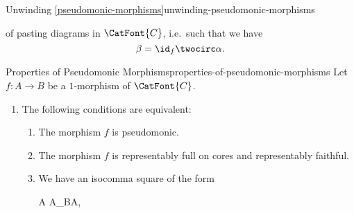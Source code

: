 \begin{remark}{Unwinding \cref{pseudomonic-morphisms}}{unwinding-pseudomonic-morphisms}
\begin{enumerate}
\begin{webcompile}
            \end{webcompile}
            of pasting diagrams in $\CatFont{C}$, i.e.\ such that we have
            \[
                \beta%
                =%
                \id_{f}\twocirc\alpha.%
            \]%
    \end{enumerate}
\end{remark}
\begin{proposition}{Properties of Pseudomonic Morphisms}{properties-of-pseudomonic-morphisms}%
    Let $f\colon A\to B$ be a $1$-morphism of $\CatFont{C}$.
    \begin{enumerate}
        \item\label{properties-of-pseudomonic-morphisms-characterisations}The following conditions are equivalent:
            \begin{enumerate}
                \item\label{properties-of-pseudomonic-morphisms-characterisations-a}The morphism $f$ is pseudomonic.
                \item\label{properties-of-pseudomonic-morphisms-characterisations-b}The morphism $f$ is representably full on cores and representably faithful.
                \item\label{properties-of-pseudomonic-morphisms-characterisations-c}We have an isocomma square of the form
                    \begin{webcompile}
                        A%
                        \eqcong%
                        A\isocomma_{B}A,%
                        \quad
\end{webcompile}
\end{enumerate}
\end{enumerate}
\end{proposition}
